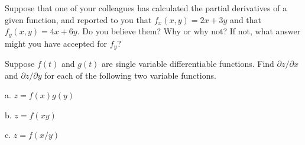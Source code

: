\exercise Suppose that one of your colleagues has calculated the partial
  derivatives of a given function, and reported to you that
  $f_x(x,y)=2x+3y$ and that $f_y(x,y)=4x+6y$.  Do you believe them?
  Why or why not?  If not, what answer might you have accepted for
  $f_y$?
\endexercise

\exercise Suppose $f(t)$ and $g(t)$ are single variable differentiable
  functions.  Find $\partial z/\partial x$ and
  $\partial z/\partial y$ for each of the following two variable functions.

\beginlist
\item{a.} $z=f(x)g(y)$
\item{b.} $z=f(xy)$
\item{c.} $z=f(x/y)$
\endlist

\endexercise

\endexercises

